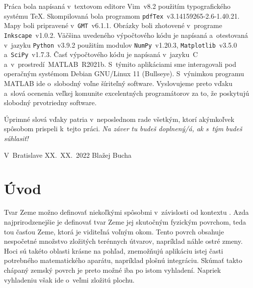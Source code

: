 \documentclass[a4paper, 12pt]{book}
\begin{document}
Práca bola napísaná v~textovom editore Vim~v8.2 použitím typografického systému
\TeX.  Skompilovaná bola programom \texttt{pdfTex}~v3.14159265-2.6-1.40.21.
Mapy boli pripravené v~\texttt{GMT}~v6.1.1.  Obrázky boli zhotovené v~programe
\texttt{Inkscape}~v1.0.2.  Väčšina uvedeného výpočtového kódu je napísaná
a~otestovaná v~jazyku \texttt{Python}~v3.9.2 použitím modulov
\texttt{NumPy}~v1.20.3, \texttt{Matplotlib}~v3.5.0 a~\texttt{SciPy}~v1.7.3.
Časť výpočtového kódu je napísaná v~jazyku~C a~v~prostredí~MATLAB~R2021b.
S~týmito aplikáciami sme interagovali pod operačným systémom Debian GNU/Linux
11 (Bullseye).  S~výnimkou programu MATLAB ide o~slobodný voľne šíriteľný
software.  Vyslovujeme preto vďaku a~slová ocenenia veľkej komunite
excelentných programátorov za to, že poskytujú slobodný prvotriedny software.

Úprimné slová vďaky patria v~neposlednom rade všetkým, ktorí akýmkoľvek
spôsobom prispeli k~tejto práci. \emph{Na záver tu budeš doplnený/á, ak s~tým
budeš súhlasiť!}


\vspace{4ex}

\noindent V~Bratislave XX.~XX.~2022 \hfill Blažej Bucha






\tableofcontents
\newpage







\chapter{Úvod}

Tvar Zeme možno definovať niekoľkými spôsobmi v~závislosti od kontextu
\citep{MoritzTheFigureOfTheEarth}.  Azda najprirodzenejšie je definovať tvar
Zeme jej skutočným fyzickým povrchom, teda tou časťou Zeme, ktorá je viditeľná
voľným okom.  Tento povrch obsahuje nespočetné množstvo zložitých terénnych
útvarov, napríklad náhle ostré zmeny.  Hoci sú takéto oblasti krásne na pohľad,
znemožňujú aplikáciu istej časti potrebného matematického aparátu, napríklad
plošnú integráciu.  Skúmať takto chápaný zemský povrch je preto možné iba po
istom vyhladení.  Napriek vyhladeniu však ide o~veľmi zložitú plochu.
\end{document}
